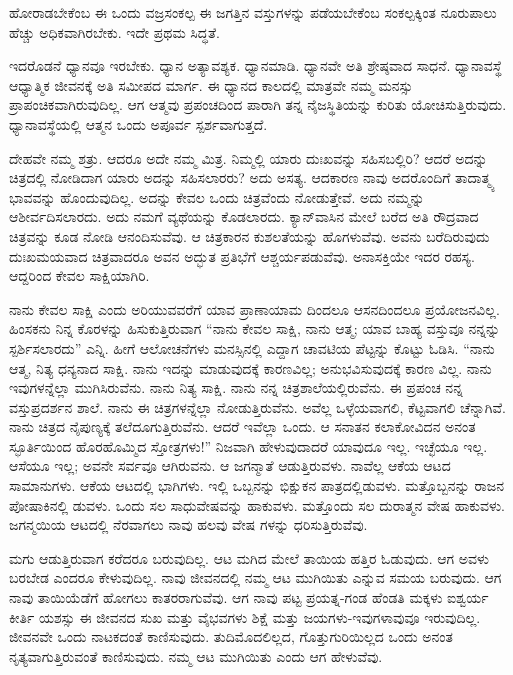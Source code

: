 ಹೋರಾಡಬೇಕೆಂಬ ಈ ಒಂದು ವಜ್ರಸಂಕಲ್ಪ ಈ ಜಗತ್ತಿನ ವಸ್ತುಗಳನ್ನು ಪಡೆಯಬೇಕೆಂಬ ಸಂಕಲ್ಪಕ್ಕಿಂತ ನೂರುಪಾಲು ಹೆಚ್ಚು ಅಧಿಕವಾಗಿರಬೇಕು. ಇದೇ ಪ್ರಥಮ ಸಿದ್ಧತೆ.

ಇದರೊಡನೆ ಧ್ಯಾನವೂ ಇರಬೇಕು. ಧ್ಯಾನ ಅತ್ಯಾವಶ್ಯಕ. ಧ್ಯಾನಮಾಡಿ. ಧ್ಯಾನವೇ ಅತಿ ಶ್ರೇಷ್ಠವಾದ ಸಾಧನೆ. ಧ್ಯಾನಾವಸ್ಥೆ ಆಧ್ಯಾತ್ಮಿಕ ಜೀವನಕ್ಕೆ ಅತಿ ಸಮೀಪದ ಮಾರ್ಗ. ಈ ಧ್ಯಾನದ ಕಾಲದಲ್ಲಿ ಮಾತ್ರವೇ ನಮ್ಮ ಮನಸ್ಸು ಪ್ರಾಪಂಚಿಕವಾಗಿರುವುದಿಲ್ಲ. ಆಗ ಆತ್ಮವು ಪ್ರಪಂಚದಿಂದ ಪಾರಾಗಿ ತನ್ನ ನೈಜಸ್ಥಿತಿಯನ್ನು ಕುರಿತು ಯೋಚಿಸುತ್ತಿರುವುದು. ಧ್ಯಾನಾವಸ್ಥೆಯಲ್ಲಿ ಆತ್ಮನ ಒಂದು ಅಪೂರ್ವ ಸ್ಪರ್ಶವಾಗುತ್ತದೆ.

ದೇಹವೇ ನಮ್ಮ ಶತ್ರು. ಆದರೂ ಅದೇ ನಮ್ಮ ಮಿತ್ರ. ನಿಮ್ಮಲ್ಲಿ ಯಾರು ದುಃಖವನ್ನು ಸಹಿಸಬಲ್ಲಿರಿ? ಆದರೆ ಅದನ್ನು ಚಿತ್ರದಲ್ಲಿ ನೋಡಿದಾಗ ಯಾರು ಅದನ್ನು ಸಹಿಸಲಾರರು? ಅದು ಅಸತ್ಯ. ಆದಕಾರಣ ನಾವು ಅದರೊಂದಿಗೆ ತಾದಾತ್ಮ್ಯ ಭಾವವನ್ನು ಹೊಂದುವುದಿಲ್ಲ. ಅದನ್ನು ಕೇವಲ ಒಂದು ಚಿತ್ರವೆಂದು ನೋಡುತ್ತೇವೆ. ಅದು ನಮ್ಮನ್ನು ಆಶೀರ್ವದಿಸಲಾರದು. ಅದು ನಮಗೆ ವ್ಯಥೆಯನ್ನು ಕೊಡಲಾರದು. ಕ್ಯಾನ್​ವಾಸಿನ ಮೇಲೆ ಬರೆದ ಅತಿ ರೌದ್ರವಾದ ಚಿತ್ರವನ್ನು ಕೂಡ ನೋಡಿ ಆನಂದಿಸುವೆವು. ಆ ಚಿತ್ರಕಾರನ ಕುಶಲತೆಯನ್ನು ಹೊಗಳುವೆವು. ಅವನು ಬರೆದಿರುವುದು ದುಃಖಮಯವಾದ ಚಿತ್ರವಾದರೂ ಅವನ ಅದ್ಭುತ ಪ್ರತಿಭೆಗೆ ಆಶ್ಚರ್ಯಪಡುವೆವು. ಅನಾಸಕ್ತಿಯೇ ಇದರ ರಹಸ್ಯ. ಆದ್ದರಿಂದ ಕೇವಲ ಸಾಕ್ಷಿಯಾಗಿರಿ.

ನಾನು ಕೇವಲ ಸಾಕ್ಷಿ ಎಂದು ಅರಿಯುವವರೆಗೆ ಯಾವ ಪ್ರಾಣಾಯಾಮ ದಿಂದಲೂ ಆಸನದಿಂದಲೂ ಪ್ರಯೋಜನವಿಲ್ಲ. ಹಿಂಸಕನು ನಿನ್ನ ಕೊರಳನ್ನು ಹಿಸುಕುತ್ತಿರುವಾಗ “ನಾನು ಕೇವಲ ಸಾಕ್ಷಿ, ನಾನು ಆತ್ಮ; ಯಾವ ಬಾಹ್ಯ ವಸ್ತುವೂ ನನ್ನನ್ನು ಸ್ಪರ್ಶಿಸಲಾರದು” ಎನ್ನಿ. ಹೀಗೆ ಆಲೋಚನೆಗಳು ಮನಸ್ಸಿನಲ್ಲಿ ಎದ್ದಾಗ ಚಾವಟಿಯ ಪೆಟ್ಟನ್ನು ಕೊಟ್ಟು ಓಡಿಸಿ. “ನಾನು ಆತ್ಮ, ನಿತ್ಯ ಧನ್ಯನಾದ ಸಾಕ್ಷಿ. ನಾನು ಇದನ್ನು ಮಾಡುವುದಕ್ಕೆ ಕಾರಣವಿಲ್ಲ; ಅನುಭವಿಸುವುದಕ್ಕೆ ಕಾರಣ ವಿಲ್ಲ. ನಾನು ಇವುಗಳನ್ನೆಲ್ಲಾ ಮುಗಿಸಿರುವೆನು. ನಾನು ನಿತ್ಯ ಸಾಕ್ಷಿ. ನಾನು ನನ್ನ ಚಿತ್ರಶಾಲೆಯಲ್ಲಿರುವೆನು. ಈ ಪ್ರಪಂಚ ನನ್ನ ವಸ್ತುಪ್ರದರ್ಶನ ಶಾಲೆ. ನಾನು ಈ ಚಿತ್ರಗಳನ್ನೆಲ್ಲಾ ನೋಡುತ್ತಿರುವೆನು. ಅವೆಲ್ಲ ಒಳ್ಳೆಯವಾಗಲಿ, ಕೆಟ್ಟವಾಗಲಿ ಚೆನ್ನಾಗಿವೆ. ನಾನು ಚಿತ್ರದ ನೈಪುಣ್ಯಕ್ಕೆ ತಲೆದೂಗುತ್ತಿರುವೆನು. ಆದರೆ ಇವೆಲ್ಲಾ ಒಂದು. ಆ ಸನಾತನ ಕಲಾಕೋವಿದನ ಅನಂತ ಸ್ಫೂರ್ತಿಯಿಂದ ಹೊರಹೊಮ್ಮಿದ ಸ್ತೋತ್ರಗಳು!” ನಿಜವಾಗಿ ಹೇಳುವುದಾದರೆ ಯಾವುದೂ ಇಲ್ಲ. ಇಚ್ಛೆಯೂ ಇಲ್ಲ. ಆಸೆಯೂ ಇಲ್ಲ; ಅವನೇ ಸರ್ವವೂ ಆಗಿರುವನು. ಆ ಜಗನ್ಮಾತೆ ಆಡುತ್ತಿರುವಳು. ನಾವೆಲ್ಲ ಆಕೆಯ ಆಟದ ಸಾಮಾನುಗಳು. ಆಕೆಯ ಆಟದಲ್ಲಿ ಭಾಗಿಗಳು. ಇಲ್ಲಿ ಒಬ್ಬನನ್ನು ಭಿಕ್ಷುಕನ ಪಾತ್ರದಲ್ಲಿಡುವಳು. ಮತ್ತೊಬ್ಬನನ್ನು ರಾಜನ ಪೋಷಾಕಿನಲ್ಲಿ ಡುವಳು. ಒಂದು ಸಲ ಸಾಧುವೇಷವನ್ನು ಹಾಕುವಳು. ಮತ್ತೊಂದು ಸಲ ದುರಾತ್ಮನ ವೇಷ ಹಾಕುವಳು. ಜಗನ್ಮಯಿಯ ಆಟದಲ್ಲಿ ನೆರವಾಗಲು ನಾವು ಹಲವು ವೇಷ ಗಳನ್ನು ಧರಿಸುತ್ತಿರುವೆವು.

ಮಗು ಆಡುತ್ತಿರುವಾಗ ಕರೆದರೂ ಬರುವುದಿಲ್ಲ. ಆಟ ಮಗಿದ ಮೇಲೆ ತಾಯಿಯ ಹತ್ತಿರ ಓಡುವುದು. ಆಗ ಅವಳು ಬರಬೇಡ ಎಂದರೂ ಕೇಳುವುದಿಲ್ಲ. ನಾವು ಜೀವನದಲ್ಲಿ ನಮ್ಮ ಆಟ ಮುಗಿಯಿತು ಎನ್ನುವ ಸಮಯ ಬರುವುದು. ಆಗ ನಾವು ತಾಯಿಯೆಡೆಗೆ ಹೋಗಲು ಕಾತರರಾಗುವೆವು. ಆಗ ನಾವು ಪಟ್ಟ ಪ್ರಯತ್ನ-ಗಂಡ ಹೆಂಡತಿ ಮಕ್ಕಳು ಐಶ್ವರ್ಯ ಕೀರ್ತಿ ಯಶಸ್ಸು ಈ ಜೀವನದ ಸುಖ ಮತ್ತು ವೈಭವಗಳು ಶಿಕ್ಷೆ ಮತ್ತು ಜಯಗಳು-ಇವುಗಳಾವುವೂ ಇರುವುದಿಲ್ಲ. ಜೀವನವೇ ಒಂದು ನಾಟಕದಂತೆ ಕಾಣಿಸುವುದು. ತುದಿಮೊದಲಿಲ್ಲದ, ಗೊತ್ತುಗುರಿಯಿಲ್ಲದ ಒಂದು ಅನಂತ ನೃತ್ಯವಾಗುತ್ತಿರುವಂತೆ ಕಾಣಿಸುವುದು. ನಮ್ಮ ಆಟ ಮುಗಿಯಿತು ಎಂದು ಆಗ ಹೇಳುವೆವು.

